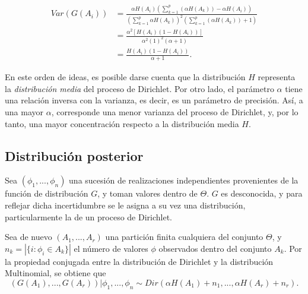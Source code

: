 \begin{equation*}
\begin{aligned}
    Var(G(A_i)) 
    &= \frac{\alpha H(A_i)\left(\sum_{k=1}^p(\alpha H(A_k)) - \alpha H(A_i)\right)}
       {\left(\sum_{k=1}^p \alpha H(A_k)\right)^2\left(\sum_{k=1}^p(\alpha H(A_k)) + 1\right)} \\
    &= \frac{\alpha^2 [H(A_i)(1 - H(A_i))]}
       {\alpha^2 (1)^2(\alpha + 1)} \\
    &= \frac{H(A_i)(1 - H(A_i))}
       {\alpha + 1}.
\end{aligned}
\end{equation*}

En este orden de ideas, es posible darse cuenta que la distribuci\'on $H$ representa la \textit{distribuci\'on media} del proceso de Dirichlet. Por otro lado, el par\'ametro $\alpha$ tiene una relaci\'on inversa con la varianza, es decir, es un par\'ametro de precisi\'on. As\'i, a una mayor $\alpha$, corresponde una menor varianza del proceso de Dirichlet, y, por lo tanto, una mayor concentraci\'on respecto a la distribuci\'on media $H$. 

\subsection{Distribuci\'on posterior}

Sea $(\phi_1,..., \phi_n)$ una sucesi\'on de realizaciones independientes provenientes de la funci\'on de distribuci\'on $G$, y toman valores dentro de $\Theta$. $G$ es desconocida, y para reflejar dicha incertidumbre se le asigna a su vez una distribuci\'on, particularmente la de un proceso de Dirichlet.

Sea de nuevo $(A_1,...,A_r)$ una partici\'on finita cualquiera del conjunto $\Theta$, y $n_k = |\{i: \phi_i \in A_k\}|$ el n\'umero de valores $\phi$ observados dentro del conjunto $A_k$. Por la propiedad conjugada entre la distribuci\'on de Dirichlet y la distribuci\'on Multinomial, se obtiene que
\begin{equation*}
   (G(A_1),...,G(A_r))|\phi_1,...,\phi_n \sim Dir(\alpha H(A_1) + n_1,...,\alpha H(A_r) + n_r). 
\end{equation*}

